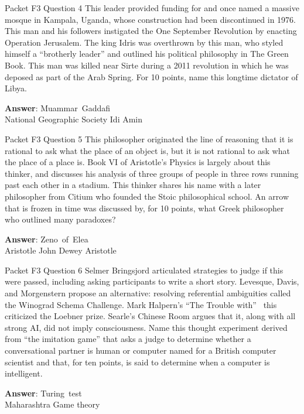 \begin{frame}{Packet F3 Question 4}
This leader provided funding for and once   named a massive mosque in Kampala, Uganda, whose construction   had been discontinued in 1976. This man and his followers instigated the One September Revolution by enacting Operation Jerusalem. The king Idris was overthrown   by this man, who styled himself a “brotherly leader” and outlined his political philosophy in The Green Book. This man   was killed near Sirte   during a 2011 revolution in which he was deposed as part of the Arab Spring.   For 10 points, name this longtime dictator of Libya.

\textbf{Answer}: Muammar\ Gaddafi\\
 National Geographic Society
 Idi Amin
\end{frame}

\begin{frame}{Packet F3 Question 5}
This philosopher originated the line of reasoning that it is rational to ask what the place of an object is, but it is not rational to ask what the place of a place is. Book VI of Aristotle’s Physics is largely about this thinker, and discusses his analysis of three groups of people in three rows running past each other in a stadium. This thinker shares his name with a later philosopher from Citium who founded the Stoic philosophical school. An arrow that is frozen in time was discussed by, for 10 points, what Greek philosopher who outlined   many paradoxes?        

\textbf{Answer}: Zeno\ of\ Elea\\
 Aristotle
 John Dewey
 Aristotle
\end{frame}

\begin{frame}{Packet F3 Question 6}
Selmer Bringsjord articulated strategies to judge if this were passed, including asking   participants to   write a short story. Levesque, Davis, and Morgenstern propose an alternative: resolving referential ambiguities called the Winograd Schema Challenge. Mark Halpern’s “The Trouble with” ~this~ criticized the Loebner prize. Searle’s Chinese   Room argues that it, along with all strong AI, did not imply consciousness. Name this thought experiment derived from “the imitation game” that     asks a judge to determine whether a conversational partner   is human or computer named for a British computer scientist and that, for ten points, is said to determine when a computer is intelligent.

\textbf{Answer}: Turing\ test\\
 Maharashtra
 Game theory
\end{frame}

